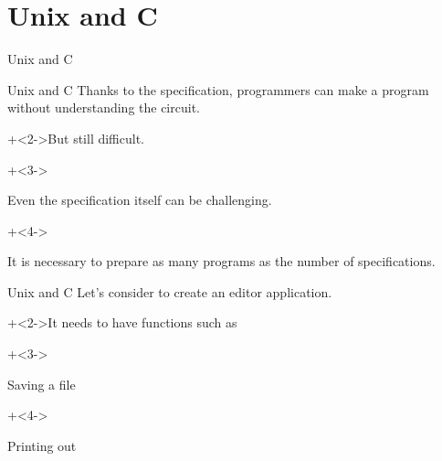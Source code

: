 %
%

\section{Unix and C}

\begin{frame}{}{}
    {\Huge Unix and C}
\end{frame}


\begin{frame}{Unix and C}{}
    Thanks to the specification, programmers can make a program without understanding the circuit.
    \vspace{4ex}

    \onslide+<2->{But still difficult.}
    \vspace{4ex}

    \begin{itemize}
        \onslide+<3->{\item Even the specification itself can be challenging.}
        \onslide+<4->{\item It is necessary to prepare as many programs as the number of specifications.}
    \end{itemize}
\end{frame}


\begin{frame}{Unix and C}{}
    Let's consider to create an editor application.
    \vspace{4ex}

    \onslide+<2->{It needs to have functions such as}
    \vspace{2ex}

    \begin{itemize}
        \onslide+<3->{\item Saving a file}
        \onslide+<4->{\item Printing out}
    \end{itemize}
\end{frame}


